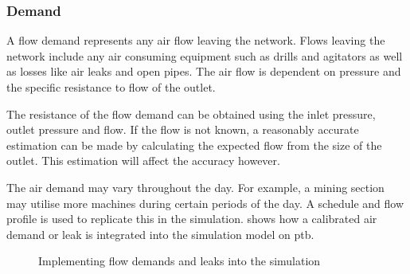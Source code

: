 		\subsubsection{Demand}
			A flow demand represents any air flow leaving the network. Flows leaving the network include any air consuming equipment such as drills and agitators as well as losses like air leaks and open pipes. The air flow is dependent on pressure and the specific resistance to flow of the outlet. 
			\par 
			The resistance of the flow demand can be obtained using the inlet pressure, outlet pressure and flow. If the flow is not known, a reasonably accurate estimation can be made by calculating the expected flow from the size of the outlet. This estimation will affect the accuracy however.
			\par
			 The air demand may vary throughout the day. For example, a mining section may utilise more machines during certain periods of the day. A schedule and flow profile is used to replicate this in the simulation.  shows how a calibrated air demand or leak is integrated into the simulation model on \gls{ptb}.
			\begin{figure}[h]
				\centering
				\caption{Implementing flow demands and leaks into the simulation} 
				\label{fig: Demand component}
			\end{figure}
